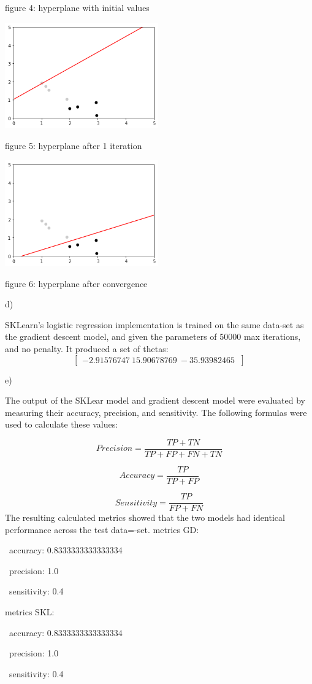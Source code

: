 \documentclass{homework}
\begin{document}
\caption{figure 4: hyperplane with initial values}

\centering
\includegraphics[width=250]{2b1.png}

\caption{figure 5: hyperplane after 1 iteration}

\centering
\includegraphics[width=250]{2bf.png}

\caption{figure 6: hyperplane after convergence}

\raggedright

d)

SKLearn's logistic regression implementation is trained on the same data-set as the gradient descent model, and given the parameters of 50000 max iterations, and no penalty. It produced a set of thetas:
\[
\begin{bmatrix}
 -2.91576747\ 15.90678769\ -35.93982465\
\end{bmatrix}
\]

e)

The output of the SKLear model and gradient descent model were evaluated by measuring their accuracy, precision, and sensitivity. The following formulas were used to calculate these values:

\[
Precision = \frac{TP+TN}{TP+FP+FN+TN}
\]

\[
Accuracy = \frac{TP}{TP+FP}
\]

\[
Sensitivity = \frac{TP}{FP+FN}
\]
The resulting calculated metrics showed that the two models had identical performance across the test data=-set.
metrics GD: 

\    accuracy:  0.8333333333333334
    
\    precision:  1.0
    
\    sensitivity:  0.4
    
metrics SKL: 

\    accuracy:  0.8333333333333334
    
\    precision:  1.0
    
\    sensitivity:  0.4
\end{document}
